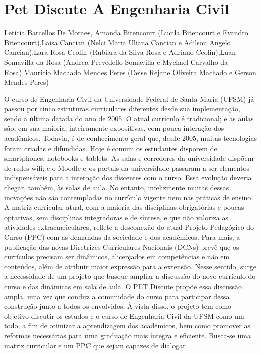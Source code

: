 \section*{Pet Discute A Engenharia Civil}

Leticia Barcellos De Moraes, Amanda Bitencourt (Lucila Bitencourt e Evandro Bitencourt),Laisa Cancian (Nelci Maria Uliana Cancian e Adilson Angelo Cancian),Lara Rosa Ceolin (Rubiara da Silva Rosa e Adriano Ceolin),Luan Somavilla da Rosa (Andrea Prevedello Somavilla e Mychael Carvalho da Rosa),Mauricio Machado Mendes Peres (Deise Rejane Oliveira Machado e Gerson Mendes Peres)

O curso de Engenharia Civil da Universidade Federal de Santa Maria (UFSM) já passou por cinco 
estruturas curriculares diferentes desde sua implementação, sendo a última datada do ano de 2005. 
O atual currículo é tradicional; e as aulas são, em sua maioria, inteiramente expositivas, com pouca 
interação dos acadêmicos. Todavia, é de conhecimento geral que, desde 2005, muitas tecnologias 
foram criadas e difundidas. Hoje é comum os estudantes disporem de smartphones, notebooks e 
tablets. As salas e corredores da universidade dispõem de redes wifi; e o Moodle e os portais da 
universidade passaram a ser elementos indispensáveis para a interação dos discentes com o curso. 
Essa evolução deveria chegar, também, às salas de aula. No entanto, infelizmente muitas dessas 
inovações não são contempladas no currículo vigente nem nas práticas de ensino. A matriz 
curricular atual, com a maioria das disciplinas obrigatórias e poucas optativas, sem disciplinas 
integradoras e de síntese, e que não valoriza as atividades extracurriculares, reflete a desconexão 
do atual Projeto Pedagógico do Curso (PPC) com as demandas da sociedade e dos acadêmicos. 
Para mais, a publicação das novas Diretrizes Curriculares Nacionais (DCNs) prevê que os 
currículos precisam ser dinâmicos, alicerçados em competências e não em conteúdos, além de 
atribuir maior expressão para a extensão. Nesse sentido, surge a necessidade de um projeto que 
busque ampliar a discussão do novo currículo do curso e das dinâmicas em sala de aula. O PET 
Discute propõe essa discussão ampla, uma vez que conduz a comunidade do curso para participar 
dessa construção junto a todos os envolvidos. À vista disso, o projeto tem como objetivo discutir 
os estudos e o curso de Engenharia Civil da UFSM como um todo, a fim de otimizar a 
aprendizagem dos acadêmicos, bem como promover as reformas necessárias para uma graduação 
mais íntegra e eficiente. Busca-se uma matriz curricular e um PPC que sejam capazes de dialogar 
